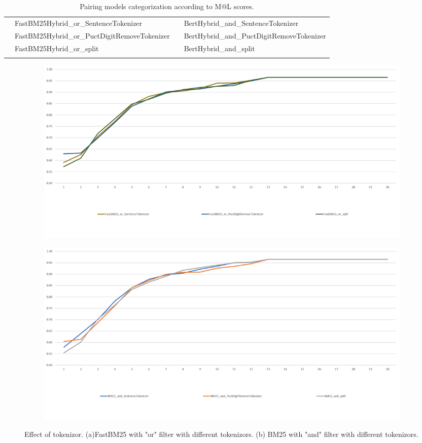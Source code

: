 \begin{table}[htbp]
{\begin{tabular}{rrrr}
			& \multicolumn{1}{l}{FastBM25Hybrid\_or\_SentenceTokenizer} &       & \multicolumn{1}{l}{BertHybrid\_and\_SentenceTokenizer} \\
			& \multicolumn{1}{l}{FastBM25Hybrid\_or\_PuctDigitRemoveTokenizer} &       & \multicolumn{1}{l}{BertHybrid\_and\_PuctDigitRemoveTokenizer} \\
			& \multicolumn{1}{l}{FastBM25Hybrid\_or\_split} &       & \multicolumn{1}{l}{BertHybrid\_and\_split} \\
			\midrule
			&       &       &  \\
	\end{tabular}}
	\caption{Pairing models categorization according to M@L scores.}
	\label{tab: pairingcategorization}%
\end{table}%

\begin{figure}[htbp]
	\centering
	\begin{subfigure}[b]{0.8\textwidth}
		\centering
		\includegraphics[width=\textwidth]{figure/partB_pairing_tokenizor_or.png}
		\caption{}
		\label{fig: pairingtokenizoreffect_or}
	\end{subfigure}
	\hfill
	\begin{subfigure}[b]{0.8\textwidth}
		\centering
		\includegraphics[width=\textwidth]{figure/partB_pairing_tokenizor_and.png}
		\caption{}
		\label{fig: pairingtokenizoreffect_and}
	\end{subfigure}
	\hfill
	\caption[]{Effect of tokenizor. (a)FastBM25 with "or" filter with different tokenizors. (b) BM25 with "and" filter with different tokenizors.}
	\label{fig: pairingtokenizoreffect}
\end{figure}

